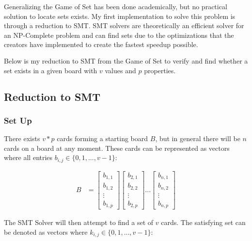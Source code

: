 \documentclass[pageno]{jpaper}
\begin{document}
Generalizing the Game of Set has been done academically, but no practical solution to locate sets exists. My first implementation to solve this problem is through a reduction to SMT. SMT solvers are theoretically an efficient solver for an NP-Complete problem and can find sets due to the optimizations that the creators have implemented to create the fastest speedup possible.

Below is my reduction to SMT from the Game of Set to verify and find whether a set exists in a given board with $v$ values and $p$ properties.


\subsection{Reduction to SMT}

\subsubsection{Set Up}

There exists $v*p$ cards forming a starting board $B$, but in general there will be $n$ cards on a board at any moment. These cards can be represented as vectors where all entries $b_{i,j} \in \{0,1, ... , v-1\}$:

\begin{align}
    B &= \begin{bmatrix}
           b_{1,1} \\
           b_{1,2} \\
           \vdots \\
           b_{1,p}
         \end{bmatrix}
         \begin{bmatrix}
           b_{2,1} \\
           b_{2,2} \\
           \vdots \\
           b_{2,p}
         \end{bmatrix} ... 
          \begin{bmatrix}
           b_{n,1} \\
           b_{n,2} \\
           \vdots \\
           b_{n,p}
         \end{bmatrix}
  \end{align}
  
The SMT Solver will then attempt to find a set of $v$ cards. The satisfying set can be denoted as vectors where $k_{i,j} \in \{0,1, ... , v-1\}$:
\end{document}
